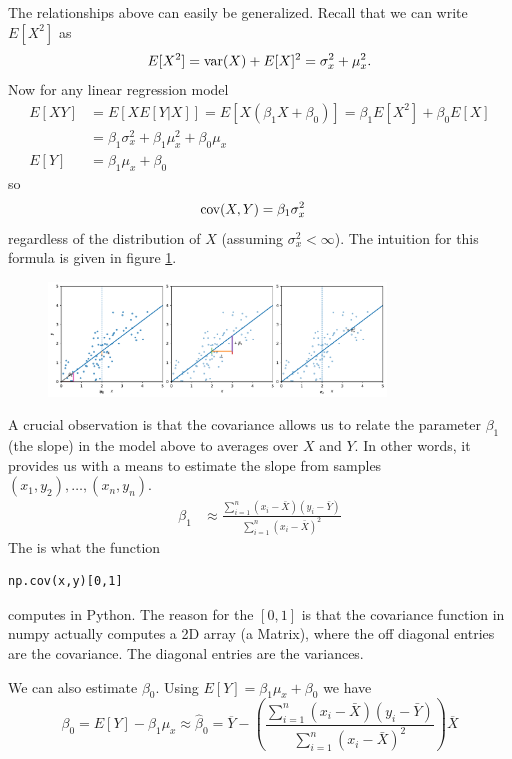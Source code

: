  
The relationships above can easily be generalized. 
Recall that we can write $E[X^2]$ as
\begin{equation*}
E[X^2] ={\rm var}(X) + E[X]^2 =  \sigma_x^2 + \mu_x^2. 
\end{equation*}
Now for any linear regression model
\begin{align*}
E[XY] &= E[XE[Y|X]] = E[X(\beta_1 X+\beta_0)] = \beta_1E[X^2] + \beta_0 E[X] \\
&= \beta_1\sigma_x^2 +\beta_1 \mu_x^2 +\beta_0 \mu_x\\
E[Y] &= \beta_1\mu_x +\beta_0
\end{align*}
so 
\begin{align*}
{\rm cov}(X,Y) &= \beta_1\sigma_x^2
\end{align*}
regardless of the distribution of $X$ (assuming $\sigma_x^2 <\infty$). The intuition for this formula is given in figure \ref{fig:cov_effect}.


\begin{figure}[h]
\centering
\includegraphics[width=0.8\textwidth]{./../figures/cov_effect}
\caption{}\label{fig:cov_effect}
\end{figure}


A crucial observation is that the covariance allows us to relate the parameter $\beta_1$ (the slope) in the model above to averages over $X$ and $Y$. In other words, it provides us with a means to estimate the slope from samples $(x_1,y_2),\dots,(x_n,y_n)$. 
\begin{align*}
 \beta_1 &\approx  \frac{\sum_{i=1}^n\left(x_i - \bar{X}\right)\left(y_i-\bar{Y}\right)}{\sum_{i=1}^n\left(x_i - \bar{X}\right)^2}
\end{align*}
The is what the function 
\begin{Verbatim}
np.cov(x,y)[0,1]
\end{Verbatim}
computes in Python. 
The reason for the $[0,1]$ is that the covariance function in numpy actually computes a 2D array (a Matrix), where the off diagonal entries are the covariance. The diagonal entries are the variances. 

We can also estimate $\beta_0$. Using $E[Y] = \beta_1 \mu_x + \beta_0$ we have
\begin{equation*}
\beta_0 =  E[Y]  - \beta_1 \mu_x \approx \hat{\beta}_0 =  \overline{Y} - \left(\frac{\sum_{i=1}^n\left(x_i - \bar{X}\right)\left(y_i-\bar{Y}\right)}{\sum_{i=1}^n\left(x_i - \bar{X}\right)^2}\right)\overline{X}
\end{equation*}



